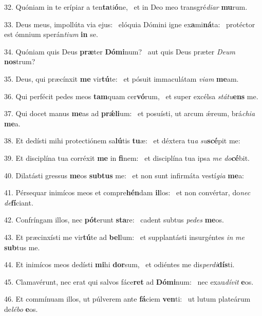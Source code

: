 32. Quóniam in te erípiar a ten\textbf{ta}ti\textbf{ó}ne, \ast\  et in Deo meo transgré\textit{di}\textit{ar} \textbf{mu}rum.\

33. Deus meus, impollúta via ejus: \dag\  elóquia Dómini igne ex\textbf{a}mi\textbf{ná}ta: \ast\  protéctor est ómnium sperán\textit{ti}\textit{um} \textbf{in} se.\

34. Quóniam quis Deus \textbf{præ}ter \textbf{Dó}\textbf{mi}num? \ast\  aut quis Deus præter \textit{De}\textit{um} \textbf{nos}trum?\

35. Deus, qui præcínxit \textbf{me} vir\textbf{tú}te: \ast\  et pósuit immaculátam \textit{vi}\textit{am} \textbf{me}am.\

36. Qui perfécit pedes meos \textbf{tam}quam cer\textbf{vó}rum, \ast\  et super excélsa \textit{stá}\textit{tu}\textbf{ens} me.\

37. Qui docet manus \textbf{me}as ad \textbf{prǽ}\textbf{li}um: \ast\  et posuísti, ut arcum ǽreum, brá\textit{chi}\textit{a} \textbf{me}a.\

38. Et dedísti mihi protectiónem sa\textbf{lú}tis \textbf{tu}æ: \ast\  et déxtera tu\textit{a} \textit{su}\textbf{scé}pit me:\

39. Et disciplína tua corréxit \textbf{me} in \textbf{fi}nem: \ast\  et disciplína tua ipsa \textit{me} \textit{do}\textbf{cé}bit.\

40. Dilatásti gressus \textbf{me}os \textbf{sub}\textbf{tus} me: \ast\  et non sunt infirmáta vestí\textit{gi}\textit{a} \textbf{me}a:\

41. Pérsequar inimícos meos et compre\textbf{hén}dam \textbf{il}los: \ast\  et non convértar, do\textit{nec} \textit{de}\textbf{fí}ciant.\

42. Confríngam illos, nec \textbf{pót}erunt \textbf{sta}re: \ast\  cadent subtus \textit{pe}\textit{des} \textbf{me}os.\

43. Et præcinxísti me vir\textbf{tú}te ad \textbf{bel}lum: \ast\  et supplantásti insurgéntes \textit{in} \textit{me} \textbf{sub}tus me.\

44. Et inimícos meos dedísti \textbf{mi}hi \textbf{dor}sum, \ast\  et odiéntes me dis\textit{per}\textit{di}\textbf{dís}ti.\

45. Clamavérunt, nec erat qui salvos fáce\textbf{ret} ad \textbf{Dó}\textbf{mi}num: \ast\  nec exau\textit{dí}\textit{vit} \textbf{e}os.\

46. Et commínuam illos, ut púlverem ante \textbf{fá}ciem \textbf{ven}ti: \ast\  ut lutum plateárum de\textit{lé}\textit{bo} \textbf{e}os.\

